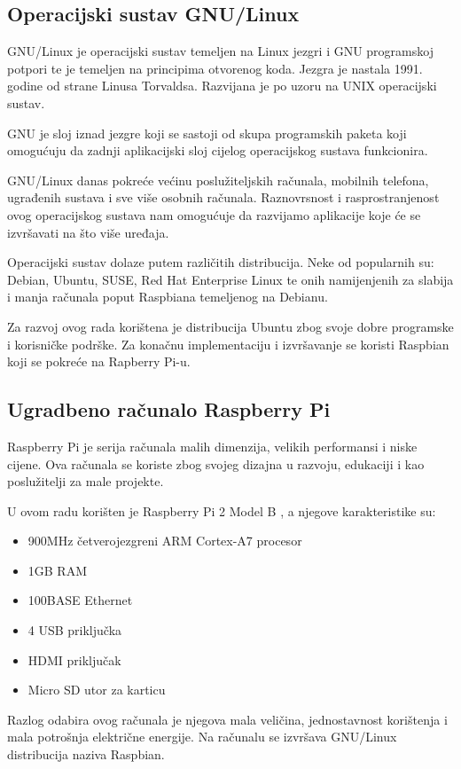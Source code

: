 \documentclass[times, utf8, zavrsni]{fer}
\begin{document}
\subsection{Operacijski sustav GNU/Linux}	
GNU/Linux je operacijski sustav temeljen na Linux jezgri i GNU programskoj potpori te je temeljen na principima otvorenog koda. Jezgra je nastala 1991. godine od strane Linusa Torvaldsa. Razvijana je po uzoru na UNIX operacijski sustav.\citep{8} \par 
GNU je sloj iznad jezgre koji se sastoji od skupa programskih paketa koji omogućuju da zadnji aplikacijski sloj cijelog operacijskog sustava funkcionira. \citep{9} \par 
GNU/Linux danas pokreće većinu poslužiteljskih računala, mobilnih telefona, ugrađenih sustava i sve više osobnih računala. Raznovrsnost i rasprostranjenost ovog operacijskog sustava nam omogućuje da razvijamo aplikacije koje će se izvršavati na što više uređaja.\par
Operacijski sustav dolaze putem različitih distribucija. Neke od popularnih su: Debian, Ubuntu, SUSE, Red Hat Enterprise Linux te onih namijenjenih za slabija i manja računala poput Raspbiana temeljenog na Debianu.\par 
Za razvoj ovog rada korištena je distribucija Ubuntu zbog svoje dobre programske i korisničke podrške. Za konačnu implementaciju i izvršavanje se koristi Raspbian koji se pokreće na Rapberry Pi-u.


\subsection{Ugradbeno računalo Raspberry Pi}
Raspberry Pi je serija računala malih dimenzija, velikih performansi i niske cijene. Ova računala se koriste zbog svojeg dizajna u razvoju, edukaciji i kao poslužitelji za male projekte. \par
U ovom radu korišten je Raspberry Pi 2 Model B \citep{10}, a njegove karakteristike su:
\begin{itemize}
\item 900MHz četverojezgreni ARM Cortex-A7 procesor
\item 1GB RAM
\item 100BASE Ethernet
\item 4 USB priključka
\item HDMI priključak
\item Micro SD utor za karticu
\end{itemize}
Razlog odabira ovog računala je njegova mala veličina, jednostavnost korištenja i mala potrošnja električne energije. Na računalu se izvršava GNU/Linux distribucija naziva Raspbian. 
\end{document}
